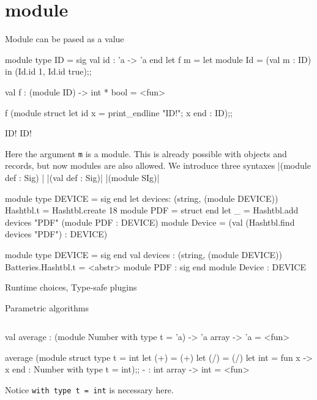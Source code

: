 \section{module}

Module can be pased as a value

\begin{redcode}
module type ID = sig val id : 'a -> 'a end
let f m = 
    let module Id = (val m : ID) in 
    (Id.id 1, Id.id true);;

val f : (module ID) -> int * bool = <fun>  

f (module struct let id x = print_endline "ID!"; x end : ID);;

ID!
ID!
\end{redcode}
 
Here the argument \verb|m| is a module. This is already possible with
objects and records, but now modules are also allowed.
We introduce three syntaxes 
|(module def : Sig) |
|(val def : Sig)|
|(module SIg)|
\begin{redcode}
module type DEVICE = sig end
let devices: (string, (module DEVICE)) Hashtbl.t = Hashtbl.create 18
module PDF = struct end
let _ = Hashtbl.add devices "PDF" (module PDF : DEVICE)
module Device =
  (val (Hashtbl.find devices "PDF") : DEVICE)

module type DEVICE = sig  end
val devices : (string, (module DEVICE)) Batteries.Hashtbl.t = <abstr>
module PDF : sig  end
module Device : DEVICE
\end{redcode}

Runtime choices, Type-safe plugins

Parametric algorithms
\inputminted{ocaml}{lang/code/param.ml}
\begin{redcode}
  val average : (module Number with type t = 'a) -> 'a array -> 'a =
  <fun>

average (module struct type t = int let (+) = (+) let (/) = (/) let int = fun x -> x  end : Number with type t = int);;
- : int array -> int = <fun>
\end{redcode}
Notice \verb|with type t = int| is necessary here.

